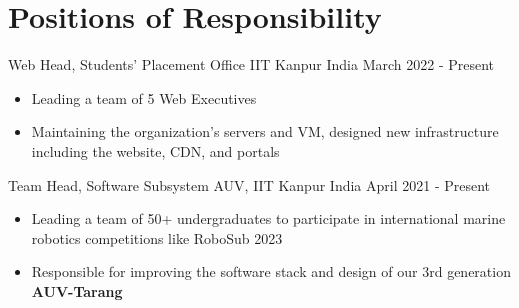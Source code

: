 \section*{\sc Positions of Responsibility}
\vspace{-2mm}
\hrulefill
\vspace{1mm}

\cventry
{Web Head, Students' Placement Office} %
{IIT Kanpur} %
{India} %
{March 2022 - Present} %
{
  \begin{itemize} %
    \item Leading a team of 5 Web Executives 
    \item Maintaining the organization’s servers and VM, designed new infrastructure including the website, CDN, and portals
  \end{itemize}
}

\cventry
{Team Head, Software Subsystem} %
{AUV, IIT Kanpur} %
{India} %
{April 2021 - Present} %
{
  \begin{itemize} %
    \item Leading a team of 50+ undergraduates to participate in international marine robotics competitions like RoboSub 2023 
    \item Responsible for improving the software stack and design of our 3rd generation \textbf{AUV-Tarang}
  \end{itemize}
}

